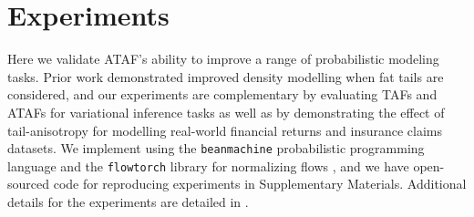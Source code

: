 \documentclass[thesis.tex]{subfiles}
\begin{document}

\vspace{-2mm}
\section{Experiments}
\label{sec:experiments}

\vspace{-1mm}
Here we validate ATAF's ability to improve
a range of probabilistic modeling tasks.
Prior work \citep{jaini2020tails} demonstrated improved
density modelling when fat tails are considered, and
our experiments are complementary by evaluating TAFs and ATAFs for variational inference tasks as well as by demonstrating the effect of tail-anisotropy for modelling real-world financial returns and insurance claims datasets.
We implement using the 
\texttt{beanmachine} probabilistic programming language \citep{tehrani2020bean}
and the
\texttt{flowtorch} library for normalizing flows \citep{flowtorchai},
and we have open-sourced code for reproducing experiments in Supplementary Materials. 
Additional details for the experiments are detailed in .

\end{document}
